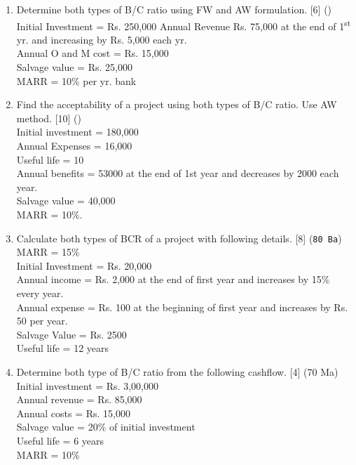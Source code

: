 \documentclass[12pt]{article}
\newcommand{\super}[1]{\textsuperscript{#1}}
\begin{document}
\begin{enumerate}
				\item Determine both types of B/C ratio using FW and AW formulation. \hfill [6] ()\\
					Initial Investment = Rs. 250,000
					Annual Revenue Rs. 75,000 at the end of 1\super{st} yr. and increasing by Rs. 5,000 each yr.\\
					Annual O and M cost = Rs. 15,000\\
					Salvage value = Rs. 25,000\\
					MARR = 10\% per yr. bank

				\item Find the acceptability of a project using both types of B/C ratio. Use AW method. \hfill [10] ()\\
				Initial investment = 180,000\\
				Annual Expenses = 16,000\\
				Useful life = 10\\
				Annual benefits = 53000 at the end of 1st year and decreases by 2000 each year.\\
				Salvage value = 40,000\\
				MARR = 10\%.

				\item Calculate both types of BCR of a project with following details. \hfill [8] (\texttt{80 Ba})\\
				MARR = 15\%\\
				Initial Investment = Rs. 20,000\\
				Annual income = Rs. 2,000 at the end of first year and increases by 15\% every year.\\
				Annual expense = Rs. 100 at the beginning of first year and increases by Rs. 50 per year.\\
				Salvage Value = Rs. 2500\\
				Useful life = 12 years

				\item Determine both type of B/C ratio from the following cashflow. \hfill [4] (70 Ma)\\
					Initial investment = Rs. 3,00,000\\
					Annual revenue = Rs. 85,000\\
					Annual costs = Rs. 15,000\\
					Salvage value = 20\% of initial investment\\
					Useful life = 6 years\\
					MARR = 10\%
			\end{enumerate}
\end{document}
